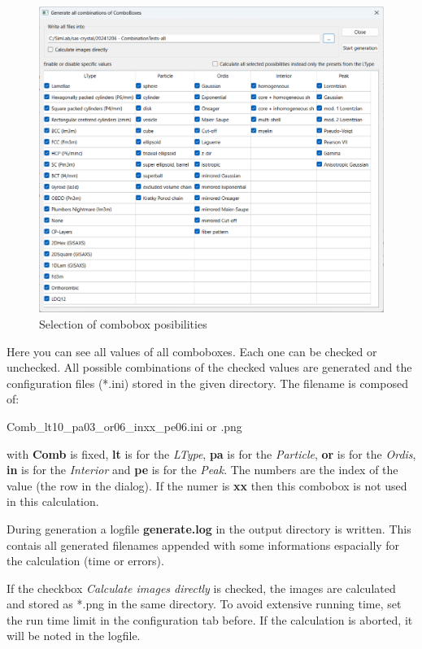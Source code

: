 \documentclass[11pt]{article} %
\begin{document}
\begin{figure}[H]
 \centering
 \includegraphics[width=\textwidth]{combinationsCBS.png}
 \caption{Selection of combobox posibilities}
\end{figure}
Here you can see all values of all comboboxes. Each one can be checked or unchecked. All possible combinations of the checked values are generated and the configuration files (*.ini) stored in the given directory. The filename is composed of: \\
\centerline{Comb\_lt10\_pa03\_or06\_inxx\_pe06.ini  or  .png}
with {\bf Comb} is fixed, {\bf lt} is for the {\it LType}, {\bf pa} is for the {\it Particle}, {\bf or} is for the {\it Ordis}, {\bf in} is for the {\it Interior} and {\bf pe} is for the {\it Peak}. The numbers are the index of the value (the row in the dialog). If the numer is {\bf xx} then this combobox is not used in this calculation.

During generation a logfile {\bf generate.log} in the output directory is written. This contais all generated filenames appended with some informations espacially for the calculation (time or errors).

If the checkbox {\it Calculate images directly} is checked, the images are calculated and stored as *.png in the same directory. To avoid extensive running time, set the run time limit in the configuration tab before. If the calculation is aborted, it will be noted in the logfile.
\end{document}
